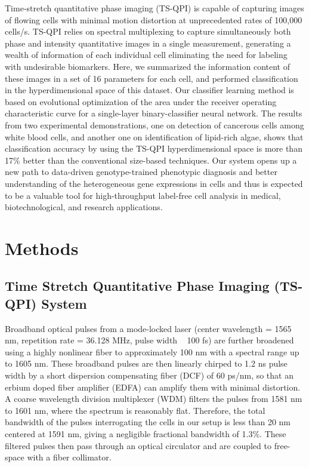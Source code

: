 \documentclass[aps,pra,reprint,superscriptaddress]{revtex4-1}
\begin{document}
Time-stretch quantitative phase imaging (TS-QPI) is capable of capturing images of flowing cells with minimal motion distortion at unprecedented rates of 100,000 cells/s. TS-QPI relies on spectral multiplexing to capture simultaneously both phase and intensity quantitative images in a single measurement, generating a wealth of information of each individual cell eliminating the need for labeling with undesirable biomarkers. Here, we summarized the information content of these images in a set of 16 parameters for each cell, and performed classification in the hyperdimensional space of this dataset. Our classifier learning method is based on evolutional optimization of the area under the receiver operating characteristic curve for a single-layer binary-classifier neural network. The results from two experimental demonstrations, one on detection of cancerous cells among white blood cells, and another one on identification of lipid-rich algae, shows that classification accuracy by using the TS-QPI hyperdimensional space is more than 17\% better than the conventional size-based techniques.
Our system opens up a new path to data-driven genotype-trained phenotypic diagnosis and better understanding of the heterogeneous gene expressions in cells and thus is expected to be a valuable tool for high-throughput label-free cell analysis in medical, biotechnological, and research applications.

\section{\label{scn:Methods} Methods}

\subsection{Time Stretch Quantitative Phase Imaging (TS-QPI) System}

Broadband optical pulses from a mode-locked laser (center wavelength = 1565 nm, repetition rate = 36.128 MHz, pulse width ~ 100 fs) are further broadened using a highly nonlinear fiber to approximately 100 nm with a spectral range up to 1605 nm. These broadband pulses are then linearly chirped to 1.2 ns pulse width by a short dispersion compensating fiber (DCF) of 60 ps/nm, so that an erbium doped fiber amplifier (EDFA) can amplify them with minimal distortion. A coarse wavelength division multiplexer (WDM) filters the pulses from 1581 nm to 1601 nm, where the spectrum is reasonably flat. Therefore, the total bandwidth of the pulses interrogating the cells in our setup is less than 20 nm centered at 1591 nm, giving a negligible fractional bandwidth of 1.3\%. These filtered pulses then pass through an optical circulator and are coupled to free-space with a fiber collimator.
\end{document}
